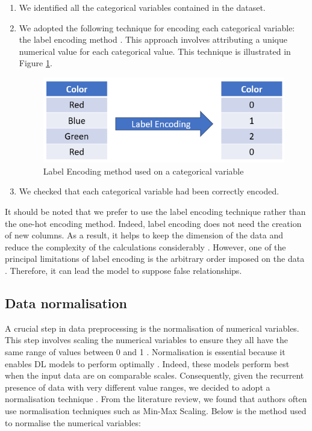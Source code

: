 \documentclass[12pt,oneside]{book} %
\begin{document}
\begin{enumerate}
    \item  We identified all the categorical variables contained in the dataset.
    \item We adopted the following technique for encoding each categorical variable: the label encoding method \cite{LabelEncoding}. This approach involves attributing a unique numerical value for each categorical value. This technique is illustrated in Figure \ref{fig:label_encoding}.

    \begin{figure}[H]
        \centering
        \includegraphics[width=0.75\linewidth]{Image/label_encoding.png}
        \caption{Label Encoding method used on a categorical variable}
        \label{fig:label_encoding}
    \end{figure}
    
    \item We checked that each categorical variable had been correctly encoded.
\end{enumerate}

\noindent It should be noted that we prefer to use the label encoding technique rather than the one-hot encoding method. Indeed, label encoding does not need the creation of new columns. As a result, it helps to keep the dimension of the data and reduce the complexity of the calculations considerably \cite{LabelEncoding}. However, one of the principal limitations of label encoding is the arbitrary order imposed on the data \cite{LabelEncoding}. Therefore, it can lead the model to suppose false relationships.

\subsection{Data normalisation}

\noindent A crucial step in data preprocessing is the normalisation of numerical variables. This step involves scaling the numerical variables to ensure they all have the same range of values between 0 and 1 \cite{Normalisation}. Normalisation is essential because it enables DL models to perform optimally \cite{Normalisation}. Indeed, these models perform best when the input data are on comparable scales. Consequently, given the recurrent presence of data with very different value ranges, we decided to adopt a normalisation technique \cite{Normalisation}. From the literature review, we found that authors often use normalisation techniques such as Min-Max Scaling. Below is the method used to normalise the numerical variables:
\end{document}
